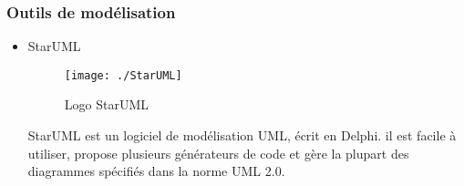 
\subsubsection{Outils de modélisation}

\begin{itemize}
\item StarUML


\begin{figure}[!h]
\begin{center}

\texttt{[image: ./StarUML]}

\caption{Logo StarUML}
\end{center}
\end{figure}


StarUML est un logiciel de modélisation UML, écrit en Delphi. il est facile à utiliser, propose plusieurs générateurs de code et gère la plupart des diagrammes spécifiés dans la norme UML 2.0.\cite{cite2}

\end{itemize}